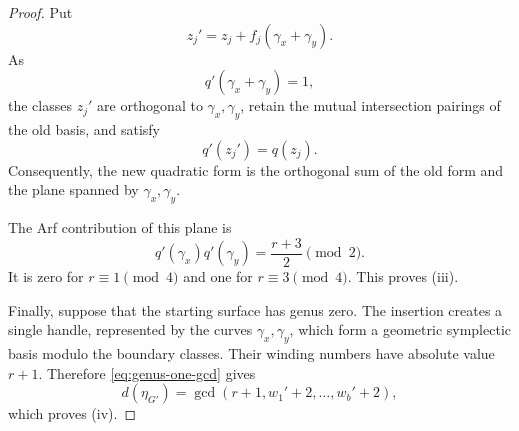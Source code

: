 \documentclass[11pt]{amsart}
\theoremstyle{definition}
\theoremstyle{plain}
\theoremstyle{definition}
\theoremstyle{definition}
\begin{document}
\begin{proof}
Put
\[
  z_j'=z_j+f_j(\gamma_x+\gamma_y).
\]
As
\[
  q'(\gamma_x+\gamma_y)=1,
\]
the classes $z_j'$ are orthogonal to
$\gamma_x,\gamma_y$, retain the mutual intersection
pairings of the old basis, and satisfy
\[
  q'(z_j')=q(z_j).
\]
Consequently, the new quadratic form is the orthogonal
sum of the old form and the plane spanned by
$\gamma_x,\gamma_y$.

The Arf contribution of this plane is
\[
  q'(\gamma_x)q'(\gamma_y)
  =\frac{r+3}{2}\pmod2.
\]
It is zero for $r\equiv1\pmod4$ and one for
$r\equiv3\pmod4$.
This proves \textup{(iii)}.

Finally, suppose that the starting surface has genus zero.
The insertion creates a single handle, represented by the
curves $\gamma_x,\gamma_y$, which form a geometric
symplectic basis modulo the boundary classes.
Their winding numbers have absolute value $r+1$.
Therefore \eqref{eq:genus-one-gcd} gives
\[
  d(\eta_{G'})
  =\gcd(r+1,w_1'+2,\ldots,w_b'+2),
\]
which proves \textup{(iv)}.
\end{proof}
\end{document}
